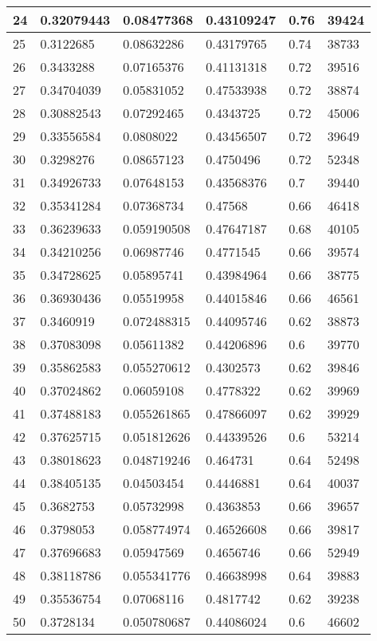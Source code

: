 \begin{longtable}{|l|l|l|l|l|l|}
24 & 0.32079443 & 0.08477368 & 0.43109247 & 0.76 & 39424 \\ \hline 
25 & 0.3122685 & 0.08632286 & 0.43179765 & 0.74 & 38733 \\ \hline 
26 & 0.3433288 & 0.07165376 & 0.41131318 & 0.72 & 39516 \\ \hline 
27 & 0.34704039 & 0.05831052 & 0.47533938 & 0.72 & 38874 \\ \hline 
28 & 0.30882543 & 0.07292465 & 0.4343725 & 0.72 & 45006 \\ \hline 
29 & 0.33556584 & 0.0808022 & 0.43456507 & 0.72 & 39649 \\ \hline 
30 & 0.3298276 & 0.08657123 & 0.4750496 & 0.72 & 52348 \\ \hline 
31 & 0.34926733 & 0.07648153 & 0.43568376 & 0.7 & 39440 \\ \hline 
32 & 0.35341284 & 0.07368734 & 0.47568 & 0.66 & 46418 \\ \hline 
33 & 0.36239633 & 0.059190508 & 0.47647187 & 0.68 & 40105 \\ \hline 
34 & 0.34210256 & 0.06987746 & 0.4771545 & 0.66 & 39574 \\ \hline 
35 & 0.34728625 & 0.05895741 & 0.43984964 & 0.66 & 38775 \\ \hline 
36 & 0.36930436 & 0.05519958 & 0.44015846 & 0.66 & 46561 \\ \hline 
37 & 0.3460919 & 0.072488315 & 0.44095746 & 0.62 & 38873 \\ \hline 
38 & 0.37083098 & 0.05611382 & 0.44206896 & 0.6 & 39770 \\ \hline 
39 & 0.35862583 & 0.055270612 & 0.4302573 & 0.62 & 39846 \\ \hline 
40 & 0.37024862 & 0.06059108 & 0.4778322 & 0.62 & 39969 \\ \hline 
41 & 0.37488183 & 0.055261865 & 0.47866097 & 0.62 & 39929 \\ \hline 
42 & 0.37625715 & 0.051812626 & 0.44339526 & 0.6 & 53214 \\ \hline 
43 & 0.38018623 & 0.048719246 & 0.464731 & 0.64 & 52498 \\ \hline 
44 & 0.38405135 & 0.04503454 & 0.4446881 & 0.64 & 40037 \\ \hline 
45 & 0.3682753 & 0.05732998 & 0.4363853 & 0.66 & 39657 \\ \hline 
46 & 0.3798053 & 0.058774974 & 0.46526608 & 0.66 & 39817 \\ \hline 
47 & 0.37696683 & 0.05947569 & 0.4656746 & 0.66 & 52949 \\ \hline 
48 & 0.38118786 & 0.055341776 & 0.46638998 & 0.64 & 39883 \\ \hline 
49 & 0.35536754 & 0.07068116 & 0.4817742 & 0.62 & 39238 \\ \hline 
50 & 0.3728134 & 0.050780687 & 0.44086024 & 0.6 & 46602 \\ \hline 
\end{longtable}